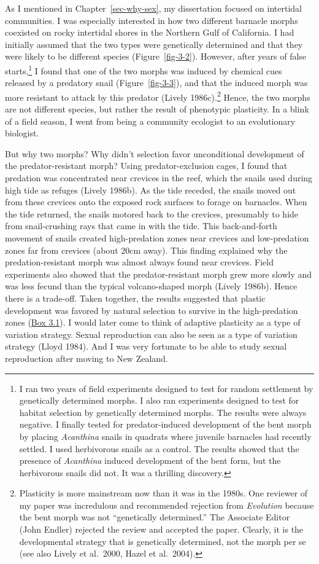\documentclass[
  letterpaper,
]{book}
\begin{document}
As I mentioned in Chapter~\ref{sec-why-sex}, my dissertation focused on
intertidal communities. I was especially interested in how two different
barnacle morphs coexisted on rocky intertidal shores in the Northern
Gulf of California. I had initially assumed that the two types were
genetically determined and that they were likely to be different species
(Figure~\ref{fig-3-2}). However, after years of false starts,\footnote{I
  ran two years of field experiments designed to test for random
  settlement by genetically determined morphs. I also ran experiments
  designed to test for habitat selection by genetically determined
  morphs. The results were always negative. I finally tested for
  predator-induced development of the bent morph by placing
  \emph{Acanthina} snails in quadrats where juvenile barnacles had
  recently settled. I used herbivorous snails as a control. The results
  showed that the presence of \emph{Acanthina} induced development of
  the bent form, but the herbivorous snails did not. It was a thrilling
  discovery.} I found that one of the two morphs was induced by chemical
cues released by a predatory snail (Figure~\ref{fig-3-3}), and that the
induced morph was more resistant to attack by this predator (Lively
1986c).\footnote{Plasticity is more mainstream now than it was in the
  1980s. One reviewer of my paper was incredulous and recommended
  rejection from \emph{Evolution} because the bent morph was not
  ``genetically determined.'' The Associate Editor (John Endler)
  rejected the review and accepted the paper. Clearly, it is the
  developmental strategy that is genetically determined, not the morph
  per se (see also Lively et al.~2000, Hazel et al.~2004).} Hence, the
two morphs are not different species, but rather the result of
phenotypic plasticity. In a blink of a field season, I went from being a
community ecologist to an evolutionary biologist.

But why two morphs? Why didn't selection favor unconditional development
of the predator-resistant morph? Using predator-exclusion cages, I found
that predation was concentrated near crevices in the reef, which the
snails used during high tide as refuges (Lively 1986b). As the tide
receded, the snails moved out from these crevices onto the exposed rock
surfaces to forage on barnacles. When the tide returned, the snails
motored back to the crevices, presumably to hide from snail-crushing
rays that came in with the tide. This back-and-forth movement of snails
created high-predation zones near crevices and low-predation zones far
from crevices (about 20cm away). This finding explained why the
predation-resistant morph was almost always found near crevices. Field
experiments also showed that the predator-resistant morph grew more
slowly and was less fecund than the typical volcano-shaped morph (Lively
1986b). Hence there is a trade-off. Taken together, the results
suggested that plastic development was favored by natural selection to
survive in the high-predation zones (\protect\hyperlink{callout-4}{Box
3.1}). I would later come to think of adaptive plasticity as a type of
variation strategy. Sexual reproduction can also be seen as a type of
variation strategy (Lloyd 1984). And I was very fortunate to be able to
study sexual reproduction after moving to New Zealand.
\end{document}
